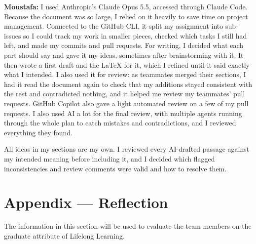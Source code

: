 \documentclass[12pt, titlepage]{article}
\begin{document}
\textbf{Moustafa:} I used Anthropic's Claude Opus 5.5, accessed through Claude
Code. Because the document was so large, I relied on it heavily to save time on
project management. Connected to the GitHub CLI, it split my assignment into
sub-issues so I could track my work in smaller pieces, checked which tasks I
still had left, and made my commits and pull requests. For writing, I decided
what each part should say and gave it my ideas, sometimes after brainstorming
with it. It then wrote a first draft and the \LaTeX{} for it, which I refined
until it said exactly what I intended. I also used it for review: as teammates
merged their sections, I had it read the document again to check that my
additions stayed consistent with the rest and contradicted nothing, and it
helped me review my teammates' pull requests. GitHub Copilot also gave a light
automated review on a few of my pull requests. I also used AI a lot for the
final review, with multiple agents running through the whole plan to catch
mistakes and contradictions, and I reviewed everything they found.

All ideas in my sections are my own. I reviewed every AI-drafted passage against
my intended meaning before including it, and I decided which flagged
inconsistencies and review comments were valid and how to resolve them.

\newpage{}

\section{Appendix --- Reflection}

The information in this section will be used to evaluate the team members on the
graduate attribute of Lifelong Learning.


\end{document}
